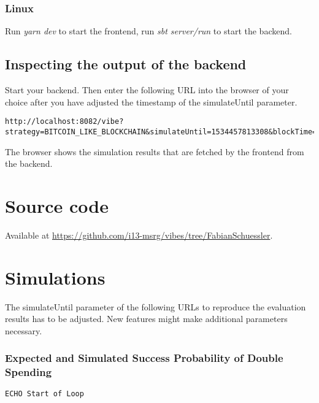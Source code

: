 \begin{appendices}
\subsubsection{Linux}
Run \textit{yarn dev} to start the frontend, run \textit{sbt server/run} to start the backend. 

\subsection{Inspecting the output of the backend}
Start your backend. Then enter the following URL into the browser of your choice after you have adjusted the timestamp of the simulateUntil parameter.

\begin{minipage}{\linewidth}
\begin{lstlisting}[style=batch]
http://localhost:8082/vibe?strategy=BITCOIN_LIKE_BLOCKCHAIN&simulateUntil=1534457813308&blockTime=600&numberOfNeighbours=4&numberOfNodes=20&neighboursDiscoveryInterval=3000&latency=900&transactionSize=1000&maxBlockSize=50&throughput=50&transactionWeight=2000&maxBlockWeight=200000&networkBandwidth=1&transactionPropagationDelay=150&hashRate=40&confirmations=2&transactionFee=0
\end{lstlisting}
\end{minipage}

The browser shows the simulation results that are fetched by the frontend from the backend.

\section{Source code}
Available at \url{https://github.com/i13-msrg/vibes/tree/FabianSchuessler}.

\section{Simulations}
The simulateUntil parameter of the following URLs to reproduce the evaluation results has to be adjusted. New features might make additional parameters necessary.

\subsubsection{Expected and Simulated Success Probability of Double Spending\label{evalDoubleSpending}}
\begin{minipage}{\linewidth}
\begin{lstlisting}[style=batch]
ECHO Start of Loop


\end{lstlisting}
\end{minipage}
\end{appendices}

